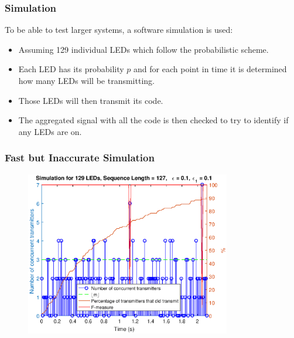 \documentclass{beamer}
\begin{document}
	\begin{frame}\frametitle{Simulation}
		
		To be able to test larger systems, a software simulation is used: 

		\begin{itemize}

			\item Assuming 129 individual LEDs which follow the probabilistic scheme.

			\item Each LED has its probability $p$ and for each point in time it is determined how many LEDs will be transmitting.

			\item Those LEDs will then transmit its code.

			\item The aggregated signal with all the code is then checked to try to identify if any LEDs are on.
		\end{itemize}

		

	\end{frame}



	\begin{frame}\frametitle{Fast but Inaccurate Simulation}
		
		\begin{figure}
			\centering
			\includegraphics[width=0.8\textwidth]{simulation-1.eps}
		\end{figure}

	\end{frame}
\end{document}
